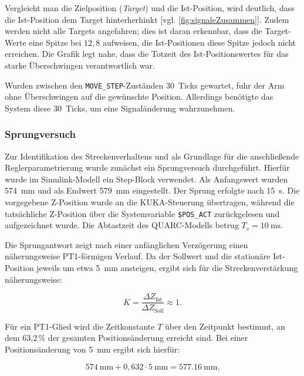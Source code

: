Vergleicht man die Zielposition (\textit{Target}) und die Ist-Position, wird deutlich, dass die Ist-Position dem Target hinterherhinkt [vgl. \ref{fig:signaleZusammen}]. Zudem werden nicht alle Targets angefahren; dies ist daran erkennbar, dass die Target-Werte eine Spitze bei $12{,}8$ aufweisen, die Ist-Positionen diese Spitze jedoch nicht erreichen. Die Grafik legt nahe, dass die Totzeit des Ist-Positionswertes für das starke Überschwingen verantwortlich war.

Wurden zwischen den \texttt{MOVE\_STEP}-Zuständen $30$~Ticks gewartet, fuhr der Arm ohne Überschwingen auf die gewünschte Position. Allerdings benötigte das System diese $30$~Ticks, um eine Signaländerung wahrzunehmen.

\subsubsection{Sprungversuch}

Zur Identifikation des Streckenverhaltens und als Grundlage für die
anschließende Reglerparametrierung wurde zunächst ein Sprungversuch
durchgeführt. Hierfür wurde im Simulink-Modell ein Step-Block verwendet. Als Anfangswert wurden \SI{574}{\milli\meter} und als Endwert
\SI{579}{\milli\meter} eingestellt. Der Sprung erfolgte nach
\SI{15}{\second}. Die vorgegebene Z-Position wurde an die KUKA-Steuerung
übertragen, während die tatsächliche Z-Position über die Systemvariable
\texttt{\$POS\_ACT} zurückgelesen und aufgezeichnet wurde. Die Abtastzeit des
QUARC-Modells betrug $T_s=\SI{10}{\milli\second}$.

Die Sprungantwort zeigt nach einer anfänglichen Verzögerung einen
näherungsweise PT1-förmigen Verlauf. Da der Sollwert und die stationäre
Ist-Position jeweils um etwa \SI{5}{\milli\meter} ansteigen, ergibt sich für
die Streckenverstärkung näherungsweise:

\begin{equation}
    K =
    \frac{\Delta Z_{\mathrm{Ist}}}
         {\Delta Z_{\mathrm{Soll}}}
    \approx 1.
\end{equation}

Für ein PT1-Glied wird die Zeitkonstante $T$ über den Zeitpunkt bestimmt, an
dem 63,2\,\% der gesamten Positionsänderung erreicht sind. Bei einer
Positionsänderung von \SI{5}{\milli\meter} ergibt sich hierfür:

\begin{equation}
    \SI{574}{\milli\meter}
    + 0{,}632 \cdot \SI{5}{\milli\meter}
    =
    \SI{577.16}{\milli\meter}.
\end{equation}

